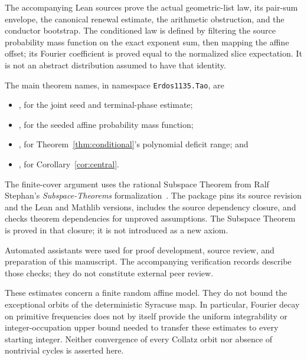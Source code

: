 \documentclass[11pt,a4paper]{article}
\begin{document}
The accompanying Lean sources prove the actual geometric-list law,
its pair-sum envelope, the canonical renewal estimate, the arithmetic
obstruction, and the conductor bootstrap. The conditioned law is
defined by filtering the source probability mass function on the
exact exponent sum, then mapping the affine offset; its Fourier
coefficient is proved equal to the normalized slice expectation.
It is not an abstract distribution assumed to have that identity.

The main theorem names, in namespace \texttt{Erdos1135.Tao}, are
\begin{itemize}
\item {},
for the joint seed and terminal-phase estimate;
\item {},
for the seeded affine probability mass function;
\item {},
for Theorem~\ref{thm:conditional}'s polynomial deficit range; and
\item {},
for Corollary~\ref{cor:central}.
\end{itemize}
The finite-cover argument uses the rational Subspace Theorem from
Ralf Stephan's \emph{Subspace-Theorems} formalization~\cite{SubspaceLean}.
The package
pins its source revision and the Lean and Mathlib versions, includes
the source dependency closure, and checks theorem dependencies for
unproved assumptions. The Subspace Theorem is proved in that closure;
it is not introduced as a new axiom.

Automated assistants were used for proof development, source review,
and preparation of this manuscript. The accompanying verification
records describe those checks; they do not constitute external peer
review.

These estimates concern a finite random affine model. They do not
bound the exceptional orbits of the deterministic Syracuse map.
In particular, Fourier decay on primitive frequencies does not by
itself provide the uniform integrability or integer-occupation upper
bound needed to transfer these estimates to every starting integer.
Neither convergence of every Collatz orbit nor absence of nontrivial
cycles is asserted here.
\end{document}
